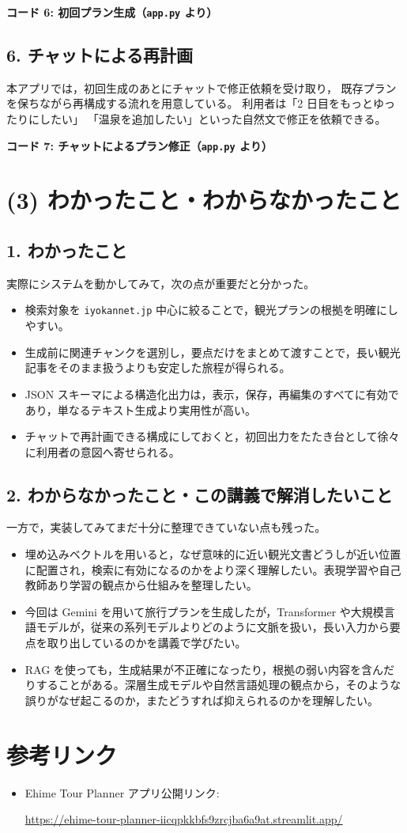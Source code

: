 \documentclass[a4paper,11pt]{ltjsarticle}
\begin{document}
\noindent\textbf{コード 6: 初回プラン生成（\texttt{app.py} より）}

\subsection*{6. チャットによる再計画}
本アプリでは，初回生成のあとにチャットで修正依頼を受け取り，
既存プランを保ちながら再構成する流れを用意している。
利用者は「2 日目をもっとゆったりにしたい」
「温泉を追加したい」といった自然文で修正を依頼できる。

\noindent\textbf{コード 7: チャットによるプラン修正（\texttt{app.py} より）}

\section*{(3) わかったこと・わからなかったこと}
\subsection*{1. わかったこと}
実際にシステムを動かしてみて，次の点が重要だと分かった。

\begin{itemize}
\item 検索対象を \texttt{iyokannet.jp} 中心に絞ることで，観光プランの根拠を明確にしやすい。
\item 生成前に関連チャンクを選別し，要点だけをまとめて渡すことで，長い観光記事をそのまま扱うよりも安定した旅程が得られる。
\item JSON スキーマによる構造化出力は，表示，保存，再編集のすべてに有効であり，単なるテキスト生成より実用性が高い。
\item チャットで再計画できる構成にしておくと，初回出力をたたき台として徐々に利用者の意図へ寄せられる。
\end{itemize}

\subsection*{2. わからなかったこと・この講義で解消したいこと}
一方で，実装してみてまだ十分に整理できていない点も残った。
\begin{itemize}
\item 埋め込みベクトルを用いると，なぜ意味的に近い観光文書どうしが近い位置に配置され，検索に有効になるのかをより深く理解したい。表現学習や自己教師あり学習の観点から仕組みを整理したい。
\item 今回は Gemini を用いて旅行プランを生成したが，Transformer や大規模言語モデルが，従来の系列モデルよりどのように文脈を扱い，長い入力から要点を取り出しているのかを講義で学びたい。
\item RAG を使っても，生成結果が不正確になったり，根拠の弱い内容を含んだりすることがある。深層生成モデルや自然言語処理の観点から，そのような誤りがなぜ起こるのか，またどうすれば抑えられるのかを理解したい。
\end{itemize}

\section*{参考リンク}
\begin{itemize}
\item Ehime Tour Planner アプリ公開リンク:\par
\url{https://ehime-tour-planner-iicqpkkbfs9zrcjba6a9at.streamlit.app/}
\end{itemize}
\end{document}
